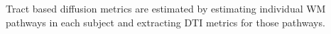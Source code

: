 \label{pipeline} Tract based diffusion metrics are estimated by estimating individual WM pathways in each subject and extracting DTI metrics for those pathways. 